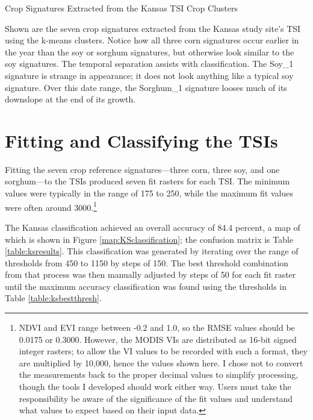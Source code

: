 \begin{ssfigure}
  \centering
  
  \caption{Crop Signatures Extracted from the Kansas TSI Crop Clusters}
  \medskip
  \small
  Shown are the seven crop signatures extracted from the Kansas study site's TSI using the k-means clusters. Notice how all three corn signatures occur earlier in the year than the soy or sorghum signatures, but otherwise look similar to the soy signatures. The temporal separation assists with classification. The Soy\_1 signature is strange in appearance; it does not look anything like a typical soy signature. Over this date range, the Sorghum\_1 signature looses much of its downslope at the end of its growth.
  \label{fig:KScropsigs}
\end{ssfigure}


\section{Fitting and Classifying the TSIs}

Fitting the seven crop reference signatures---three corn, three soy, and one sorghum---to the TSIs produced seven fit rasters for each TSI. The minimum values were typically in the range of 175 to 250, while the maximum fit values were often around 3000.\footnote{NDVI and EVI range between -0.2 and 1.0, so the RMSE values should be 0.0175 or 0.3000. However, the MODIS VIs are distributed as 16-bit signed integer rasters; to allow the VI values to be recorded with such a format, they are multiplied by 10,000, hence the values shown here. I chose not to convert the measurements back to the proper decimal values to simplify processing, though the tools I developed should work either way.  Users must take the responsibility be aware of the significance of the fit values and understand what values to expect based on their input data.} 

The Kansas classification achieved an overall accuracy of 84.4 percent, a map of which is shown in Figure \ref{map:KSclassification}; the confusion matrix is Table \ref{table:ksresults}. This classification was generated by iterating over the range of thresholds from 450 to 1150 by steps of 150. The best threshold combination from that process was then manually adjusted by steps of 50 for each fit raster until the maximum accuracy classification was found using the thresholds in Table \ref{table:ksbestthresh}.


